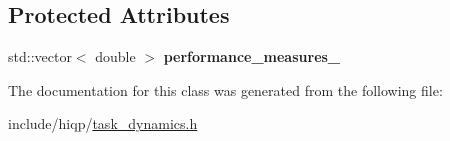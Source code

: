 \subsection*{Protected Attributes}
\begin{DoxyCompactItemize}
\item 
\hypertarget{classhiqp_1_1TaskDynamics_acbef47a5ae066079eb530aa0d6b02569}{std\-::vector$<$ double $>$ {\bfseries performance\-\_\-measures\-\_\-}}\label{classhiqp_1_1TaskDynamics_acbef47a5ae066079eb530aa0d6b02569}

\end{DoxyCompactItemize}


The documentation for this class was generated from the following file\-:\begin{DoxyCompactItemize}
\item 
include/hiqp/\hyperlink{task__dynamics_8h}{task\-\_\-dynamics.\-h}\end{DoxyCompactItemize}
